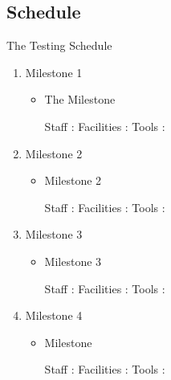 


\subsection{Schedule}




\centerline{ The Testing Schedule}

\begin{enumerate}
   \item Milestone 1  
   \begin{itemize}
     \item The Milestone

     Staff :
     Facilities :
     Tools :

   \end{itemize}
  
  \item Milestone 2 
   \begin{itemize}
     \item Milestone 2

     Staff :
     Facilities :
     Tools :

   \end{itemize}

     \item Milestone 3
   \begin{itemize}
     \item Milestone 3

     Staff :
     Facilities :
     Tools :
   \end{itemize}



 \item Milestone 4
   \begin{itemize}
 	\item Milestone 
 	
 	 Staff :
     Facilities :
     Tools :
 	 \end{itemize}
 	 \end{enumerate}
